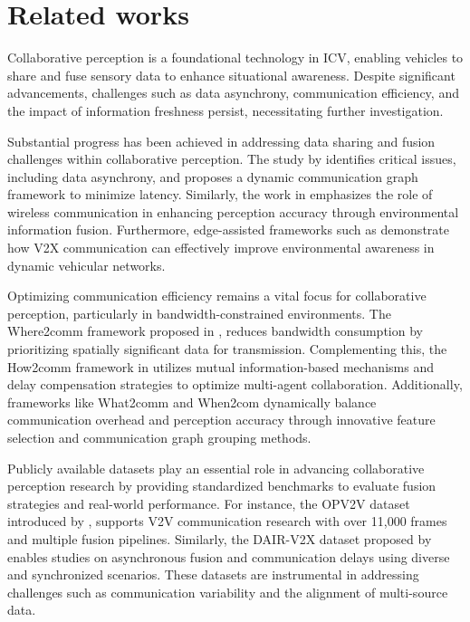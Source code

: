 \section{Related works}
Collaborative perception is a foundational technology in ICV, enabling vehicles to share and fuse sensory data to enhance situational awareness. Despite significant advancements, challenges such as data asynchrony, communication efficiency, and the impact of information freshness persist, necessitating further investigation. 


Substantial progress has been achieved in addressing data sharing and fusion challenges within collaborative perception. The study by \cite{hu2024collaborativeperceptionconnectedautonomous} identifies critical issues, including data asynchrony, and proposes a dynamic communication graph framework to minimize latency. Similarly, the work in \cite{DBLP:journals/sensors/CuiZXYF22} emphasizes the role of wireless communication in enhancing perception accuracy through environmental information fusion. Furthermore, edge-assisted frameworks such as  \cite{9709015} demonstrate how V2X communication can effectively improve environmental awareness in dynamic vehicular networks.

Optimizing communication efficiency remains a vital focus for collaborative perception, particularly in bandwidth-constrained environments. The Where2comm framework proposed in \cite{NEURIPS2022_1f5c5cd0}, reduces bandwidth consumption by prioritizing spatially significant data for transmission. Complementing this, the How2comm framework in \cite{NEURIPS2023_4f31327e} utilizes mutual information-based mechanisms and delay compensation strategies to optimize multi-agent collaboration. Additionally, frameworks like What2comm \cite{10.1145/3581783.3611699} and When2com \cite{9156848} dynamically balance communication overhead and perception accuracy through innovative feature selection and communication graph grouping methods.

Publicly available datasets play an essential role in advancing collaborative perception research by providing standardized benchmarks to evaluate fusion strategies and real-world performance. For instance, the OPV2V dataset introduced by \cite{10.1109/ICRA46639.2022.9812038} , supports V2V communication research with over 11,000 frames and multiple fusion pipelines. Similarly, the DAIR-V2X dataset proposed by \cite{9879243} enables studies on asynchronous fusion and communication delays using diverse and synchronized scenarios. These datasets are instrumental in addressing challenges such as communication variability and the alignment of multi-source data.

